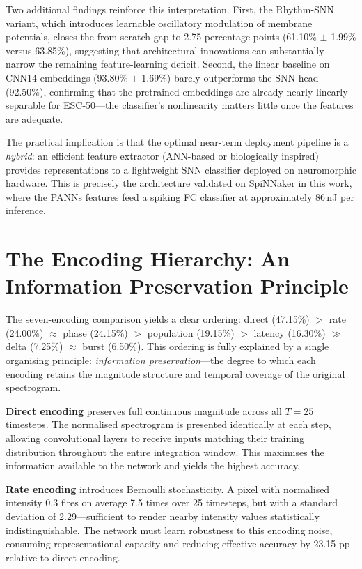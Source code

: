 Two additional findings reinforce this interpretation. First, the Rhythm-SNN variant, which introduces learnable oscillatory modulation of membrane potentials, closes the from-scratch gap to 2.75 percentage points (61.10\% $\pm$ 1.99\% versus 63.85\%), suggesting that architectural innovations can substantially narrow the remaining feature-learning deficit. Second, the linear baseline on CNN14 embeddings (93.80\% $\pm$ 1.69\%) barely outperforms the SNN head (92.50\%), confirming that the pretrained embeddings are already nearly linearly separable for ESC-50---the classifier's nonlinearity matters little once the features are adequate.

The practical implication is that the optimal near-term deployment pipeline is a \emph{hybrid}: an efficient feature extractor (ANN-based or biologically inspired) provides representations to a lightweight SNN classifier deployed on neuromorphic hardware. This is precisely the architecture validated on SpiNNaker in this work, where the PANNs features feed a spiking FC classifier at approximately 86\,nJ per inference.

\section{The Encoding Hierarchy: An Information Preservation Principle}
\label{sec:encoding-hierarchy}

The seven-encoding comparison yields a clear ordering: direct (47.15\%) $>$ rate (24.00\%) $\approx$ phase (24.15\%) $>$ population (19.15\%) $>$ latency (16.30\%) $\gg$ delta (7.25\%) $\approx$ burst (6.50\%). This ordering is fully explained by a single organising principle: \emph{information preservation}---the degree to which each encoding retains the magnitude structure and temporal coverage of the original spectrogram.

\textbf{Direct encoding} preserves full continuous magnitude across all $T = 25$ timesteps. The normalised spectrogram is presented identically at each step, allowing convolutional layers to receive inputs matching their training distribution throughout the entire integration window. This maximises the information available to the network and yields the highest accuracy.

\textbf{Rate encoding} introduces Bernoulli stochasticity. A pixel with normalised intensity 0.3 fires on average 7.5 times over 25 timesteps, but with a standard deviation of 2.29---sufficient to render nearby intensity values statistically indistinguishable. The network must learn robustness to this encoding noise, consuming representational capacity and reducing effective accuracy by 23.15 pp relative to direct encoding.

